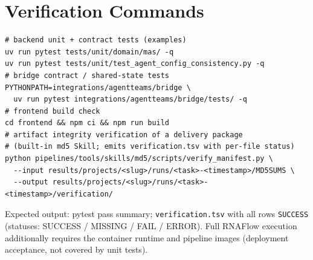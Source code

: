 \documentclass[11pt,a4paper]{article}
\begin{document}
\section{Verification Commands}

\begin{verbatim}
# backend unit + contract tests (examples)
uv run pytest tests/unit/domain/mas/ -q
uv run pytest tests/unit/test_agent_config_consistency.py -q
# bridge contract / shared-state tests
PYTHONPATH=integrations/agentteams/bridge \
  uv run pytest integrations/agentteams/bridge/tests/ -q
# frontend build check
cd frontend && npm ci && npm run build
# artifact integrity verification of a delivery package
# (built-in md5 Skill; emits verification.tsv with per-file status)
python pipelines/tools/skills/md5/scripts/verify_manifest.py \
  --input results/projects/<slug>/runs/<task>-<timestamp>/MD5SUMS \
  --output results/projects/<slug>/runs/<task>-<timestamp>/verification/
\end{verbatim}

Expected output: pytest pass summary; \texttt{verification.tsv} with all rows \texttt{SUCCESS} (statuses: SUCCESS / MISSING / FAIL / ERROR). Full RNAFlow execution additionally requires the container runtime and pipeline images (deployment acceptance, not covered by unit tests).
\end{document}
